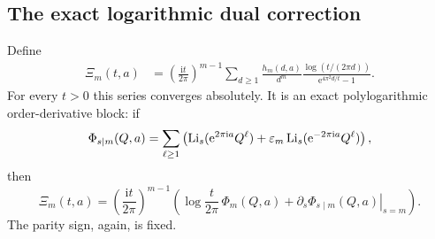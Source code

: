 \documentclass[11pt,a4paper]{article}
\numberwithin{equation}{section}
\theoremstyle{definition}\newtheorem{definition}[theorem]{Definition}
\theoremstyle{remark}\newtheorem{remark}[theorem]{Remark}
\newcommand{\ii}{\mathrm i}\newcommand{\e}{\mathrm e}
\newcommand{\eps}{\varepsilon}\newcommand{\muh}{\widehat\mu}
\begin{document}
\subsection{The exact logarithmic dual correction}
Define
\begin{align}
 \Xi_m(t,a)&=\left(\frac{\ii t}{2\pi}\right)^{m-1}
 \sum_{d\ge1}\frac{h_m(d,a)}{d^m}
             \frac{\log(t/(2\pi d))}{\e^{4\pi^2d/t}-1}.
 \label{eq:Xi}
\end{align}
For every $t>0$ this series converges absolutely. It is an exact
polylogarithmic order-derivative block: if
\begin{equation}
 \Phi_{s\mid m}(Q,a)=\sum_{\ell\ge1}
 \left(\Li_s(\e^{2\pi\ii a}Q^\ell)
              +\eps_m\Li_s(\e^{-2\pi\ii a}Q^\ell)\right),
 \label{eq:fixed-Phi}
\end{equation}
then
\begin{equation}
 \Xi_m(t,a)=\left(\frac{\ii t}{2\pi}\right)^{m-1}
 \left(\log\frac{t}{2\pi}\,\Phi_m(Q,a)
          +\left.\partial_s\Phi_{s\mid m}(Q,a)\right|_{s=m}\right).
 \label{eq:Xi-order}
\end{equation}
The parity sign, again, is fixed.
\end{document}
